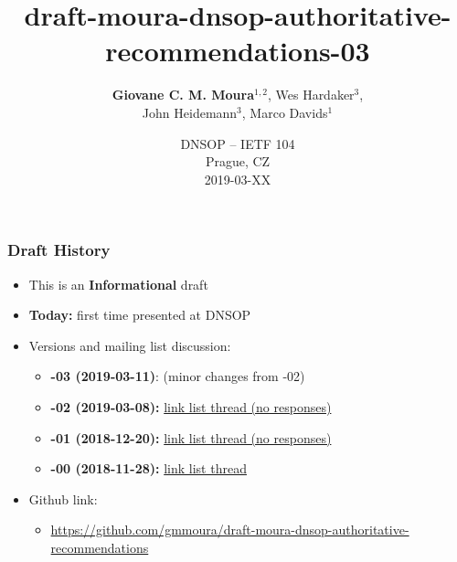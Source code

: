 \documentclass[11pt,show 
notes,notheorems,noamsthm,blank]{beamer} %
\begin{document}
\title{draft-moura-dnsop-authoritative-recommendations-03}  
\author[Moura et. al]{\textbf{Giovane C. M. Moura}$^{1,2}$, Wes Hardaker$^3$, 
\\John Heidemann$^3$, Marco Davids$^1$\\}
\vspace{-0.3cm}


   
   
\date {DNSOP -- IETF 104\\Prague, CZ\\
2019-03-XX\\


}  

\frame{\titlepage} 






\begin{frame}
\frametitle{Draft History}


\begin{itemize}


\item This is an \textbf{Informational} draft 
\item \textbf{Today:} first time presented at DNSOP 

\item Versions and mailing list discussion:

\begin{itemize}

  \item \textbf{-03 (2019-03-11)}: (minor changes from -02)   
  \item \textbf{-02 (2019-03-08):}   
\href{https://mailarchive.ietf.org/arch/msg/dnsop/u_w7KI7BkLmWQ7ii0P_PTEYBcus}{
 link  list thread (no responses) }
 
 

  \item \textbf{-01 (2018-12-20):} 
\href{https://mailarchive.ietf.org/arch/msg/dnsop/2R8Ab4-7sKmOY7-XcJ3yLSq6Gcc}{
 link list thread (no responses)} 


  \item \textbf{-00 (2018-11-28):}   
\href{https://mailarchive.ietf.org/arch/msg/dnsop/AMMr6dDDUmShnG90URv6AJCY_VQ}{
 link list thread}

\end{itemize}

\item Github link: 
\begin{itemize}
 \item \small
\url{https://github.com/gmmoura/draft-moura-dnsop-authoritative-recommendations}

\end{itemize}



\end{itemize}


\end{frame}
\end{document}
